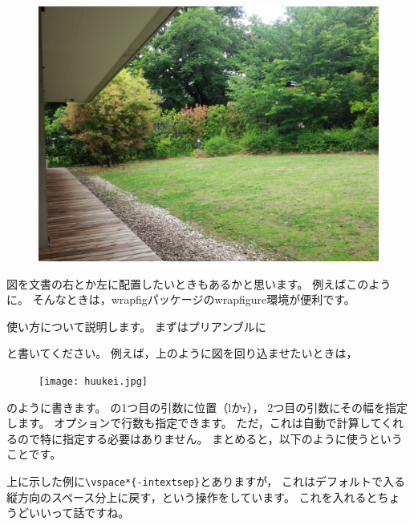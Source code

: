 \begin{figure}
\vspace*{-\intextsep}
\includegraphics[clip, width=10zw, angle=180]{figures_for_pictures/wakan.jpg}
\end{figure}

図を文書の右とか左に配置したいときもあるかと思います。
例えばこのように。
そんなときは，wrapfigパッケージのwrapfigure環境が便利です。

使い方について説明します。
まずはプリアンブルに
\begin{ITeX}
\usepackage{wrapfig}
\end{ITeX}
と書いてください。
例えば，上のように図を回り込ませたいときは，
\begin{ITeX}
\begin{figure}
\vspace*{-\intextsep}
\texttt{[image: huukei.jpg]}
\end{figure}
\end{ITeX}
のように書きます。
\verb||の1つ目の引数に位置（lかr），
2つ目の引数にその幅を指定します。
オプションで行数も指定できます。
ただ，これは自動で計算してくれるので特に指定する必要はありません。
まとめると，以下のように使うということです。
\begin{ITeX}
\begin{figure}
\end{ITeX}

上に示した例に\verb|\vspace*{-intextsep}|とありますが，
これはデフォルトで入る縦方向のスペース分上に戻す，という操作をしています。
これを入れるとちょうどいいって話ですね。

